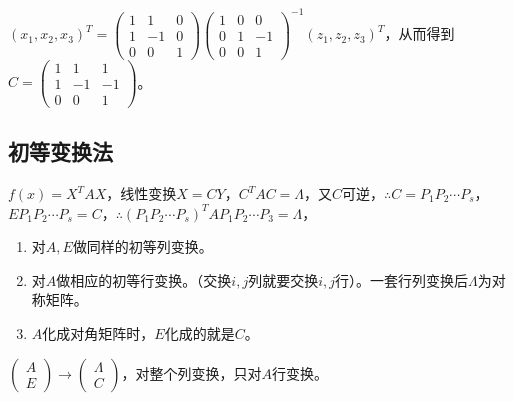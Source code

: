 \documentclass[UTF8, 12pt]{ctexart}
\begin{document}
$(x_1,x_2,x_3)^T=\left(\begin{array}{ccc}
    1 & 1 & 0 \\
    1 & -1 & 0 \\
    0 & 0 & 1
\end{array}\right)\left(\begin{array}{ccc}
    1 & 0 & 0 \\
    0 & 1 & -1 \\
    0 & 0 & 1
\end{array}\right)^{-1}(z_1,z_2,z_3)^T$，从而得到$C=\left(\begin{array}{ccc}
    1 & 1 & 1 \\
    1 & -1 & -1 \\
    0 & 0 & 1
\end{array}\right)$。

\subsection{初等变换法}

$f(x)=X^TAX$，线性变换$X=CY$，$C^TAC=\Lambda$，又$C$可逆，$\therefore C=P_1P_2\cdots P_s$，$EP_1P_2\cdots P_s=C$，$\therefore(P_1P_2\cdots P_s)^TAP_1P_2\cdots P_3=\Lambda$，

\begin{enumerate}
    \item 对$A,E$做同样的初等列变换。
    \item 对$A$做相应的初等行变换。（交换$i,j$列就要交换$i,j$行）。一套行列变换后$\Lambda$为对称矩阵。
    \item $A$化成对角矩阵时，$E$化成的就是$C$。
\end{enumerate}

$\left(\begin{array}{c}
    A \\
    E
\end{array}\right)\rightarrow\left(\begin{array}{c}
    \Lambda \\
    C
\end{array}\right)$，对整个列变换，只对$A$行变换。
\end{document}
